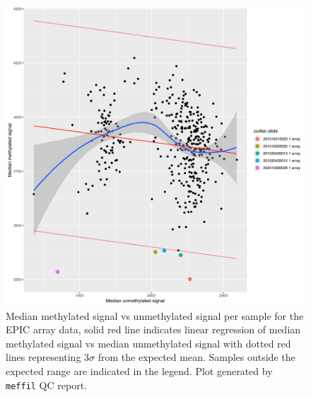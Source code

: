 \documentclass[
]{book}
\begin{document}
\begin{figure}

{\centering \includegraphics[width=0.8\linewidth]{figs/MAVIDOS-II-qcEPICmethVsUnmeth} 

}

\caption{Median methylated signal vs unmethylated signal per sample for the EPIC array data, solid red line indicates linear regression of median methylated signal vs median unmethylated signal with dotted red lines representing \(3\sigma\) from the expected mean. Samples outside the expected range are indicated in the legend. Plot generated by \texttt{meffil} QC report.}\label{fig:MAVIDOSIIqcEPICmethVsUnmeth}
\end{figure}
\end{document}
